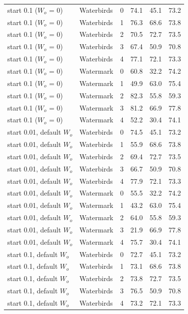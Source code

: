 \documentclass[10pt]{article}
\begin{document}
\begin{longtable}{llrrrr}
start 0.1 ($W_o$ = 0) & Waterbirds & 0 & 74.1 & 45.1 & 73.2 \\
start 0.1 ($W_o$ = 0) & Waterbirds & 1 & 76.3 & 68.6 & 73.8 \\
start 0.1 ($W_o$ = 0) & Waterbirds & 2 & 70.5 & 72.7 & 73.5 \\
start 0.1 ($W_o$ = 0) & Waterbirds & 3 & 67.4 & 50.9 & 70.8 \\
start 0.1 ($W_o$ = 0) & Waterbirds & 4 & 77.1 & 72.1 & 73.3 \\
start 0.1 ($W_o$ = 0) & Watermark & 0 & 60.8 & 32.2 & 74.2 \\
start 0.1 ($W_o$ = 0) & Watermark & 1 & 49.9 & 63.0 & 75.4 \\
start 0.1 ($W_o$ = 0) & Watermark & 2 & 82.3 & 55.8 & 59.3 \\
start 0.1 ($W_o$ = 0) & Watermark & 3 & 81.2 & 66.9 & 77.8 \\
start 0.1 ($W_o$ = 0) & Watermark & 4 & 52.2 & 30.4 & 74.1 \\
start 0.01, default $W_o$ & Waterbirds & 0 & 74.5 & 45.1 & 73.2 \\
start 0.01, default $W_o$ & Waterbirds & 1 & 55.9 & 68.6 & 73.8 \\
start 0.01, default $W_o$ & Waterbirds & 2 & 69.4 & 72.7 & 73.5 \\
start 0.01, default $W_o$ & Waterbirds & 3 & 66.7 & 50.9 & 70.8 \\
start 0.01, default $W_o$ & Waterbirds & 4 & 77.9 & 72.1 & 73.3 \\
start 0.01, default $W_o$ & Watermark & 0 & 55.5 & 32.2 & 74.2 \\
start 0.01, default $W_o$ & Watermark & 1 & 43.2 & 63.0 & 75.4 \\
start 0.01, default $W_o$ & Watermark & 2 & 64.0 & 55.8 & 59.3 \\
start 0.01, default $W_o$ & Watermark & 3 & 21.9 & 66.9 & 77.8 \\
start 0.01, default $W_o$ & Watermark & 4 & 75.7 & 30.4 & 74.1 \\
start 0.1, default $W_o$ & Waterbirds & 0 & 72.7 & 45.1 & 73.2 \\
start 0.1, default $W_o$ & Waterbirds & 1 & 73.1 & 68.6 & 73.8 \\
start 0.1, default $W_o$ & Waterbirds & 2 & 73.8 & 72.7 & 73.5 \\
start 0.1, default $W_o$ & Waterbirds & 3 & 76.5 & 50.9 & 70.8 \\
start 0.1, default $W_o$ & Waterbirds & 4 & 73.2 & 72.1 & 73.3 \\

\end{longtable}
\end{document}
